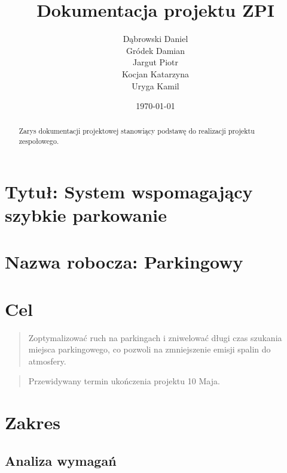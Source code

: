 \documentclass[12pt,a4paper]{article}
\begin{document}
\title{Dokumentacja projektu ZPI}
\author{Dąbrowski Daniel\\ Gródek Damian\\ Jargut Piotr\\ Kocjan Katarzyna\\ Uryga Kamil}
\date{\today}

\maketitle

\begin{abstract}
Zarys dokumentacji projektowej stanowiący podstawę do realizacji projektu \\ zespołowego. 
\end{abstract}



\newpage

\tableofcontents
\listoffigures



\newpage

\section{Tytuł: System wspomagający szybkie parkowanie}

\section{Nazwa robocza: Parkingowy}

\section{Cel}
\begin{quotation}
Zoptymalizować ruch na parkingach i zniwelować długi czas szukania miejsca parkingowego, co pozwoli na zmniejszenie emisji spalin do atmosfery.
\end{quotation}
\begin{quotation}
Przewidywany termin ukończenia projektu 10 Maja.
\end{quotation}

\section{Zakres}

\subsection{Analiza wymagań}
\end{document}
